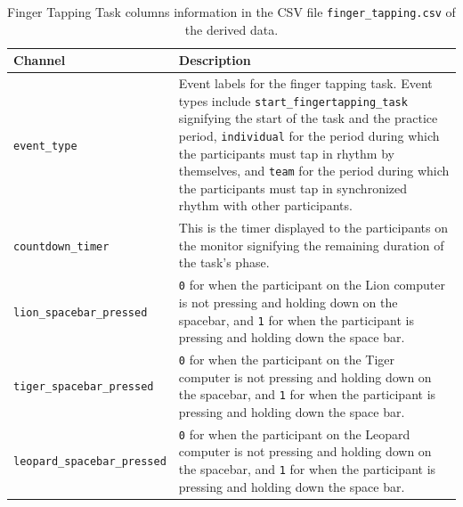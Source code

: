 
\begin{table}
\centering
\begin{tabularx}{\textwidth}{lX}
    \toprule
Channel & Description \\
\midrule
\texttt{event\_type} & Event labels for the finger tapping task. Event types include \texttt{start\_fingertapping\_task} signifying the start of the task and the practice period, \texttt{individual} for the period during which the participants must tap in rhythm by themselves, and \texttt{team} for the period during which the participants must tap in synchronized rhythm with other participants.\\
\texttt{countdown\_timer} & This is the timer displayed to the participants on the monitor signifying the remaining duration of the task's phase.\\
\texttt{lion\_spacebar\_pressed} & \texttt{0} for when the participant on the Lion computer is not pressing and holding down on the spacebar, and \texttt{1} for when the participant is pressing and holding down the space bar.\\
\texttt{tiger\_spacebar\_pressed} & \texttt{0} for when the participant on the Tiger computer is not pressing and holding down on the spacebar, and \texttt{1} for when the participant is pressing and holding down the space bar.\\
\texttt{leopard\_spacebar\_pressed} & \texttt{0} for when the participant on the Leopard computer is not pressing and holding down on the spacebar, and \texttt{1} for when the participant is pressing and holding down the space bar.\\
\bottomrule
\end{tabularx}
\caption{Finger Tapping Task columns information in the CSV file \texttt{finger\_tapping.csv} of the derived data.}
\label{tab:finger_task_columns}
\end{table}


